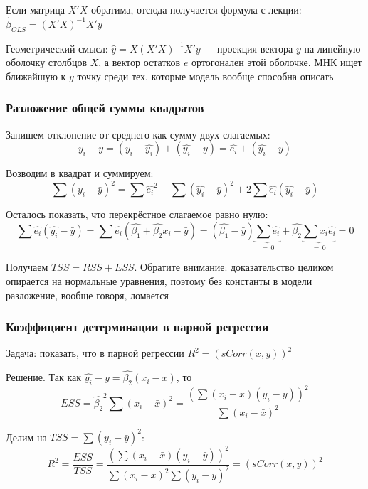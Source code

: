 \documentclass[12pt,a4paper]{article}
\numberwithin{equation}{section}
\theoremstyle{plain}
\theoremstyle{definition}
\theoremstyle{remark}
\begin{document}
Если матрица $X'X$ обратима, отсюда получается формула с лекции: $\hat{\beta}_{OLS} = \left(X'X\right)^{-1}X'y$

Геометрический смысл: $\hat{y} = X\left(X'X\right)^{-1}X'y$ — проекция вектора $y$ на линейную оболочку столбцов $X$, а вектор остатков $e$ ортогонален этой оболочке. МНК ищет ближайшую к $y$ точку среди тех, которые модель вообще способна описать

\subsubsection{Разложение общей суммы квадратов}

Запишем отклонение от среднего как сумму двух слагаемых:
$$
    y_i - \bar{y} = \left(y_i - \hat{y_i}\right) + \left(\hat{y_i} - \bar{y}\right) = \hat{e_i} + \left(\hat{y_i} - \bar{y}\right)
$$

Возводим в квадрат и суммируем:
$$
    \sum \left(y_i - \bar{y}\right)^2 = \sum \hat{e_i}^2 + \sum \left(\hat{y_i} - \bar{y}\right)^2 + 2\sum \hat{e_i}\left(\hat{y_i} - \bar{y}\right)
$$

Осталось показать, что перекрёстное слагаемое равно нулю:
$$
    \sum \hat{e_i}\left(\hat{y_i} - \bar{y}\right) = \sum \hat{e_i}\left(\hat{\beta_1} + \hat{\beta_2}x_i - \bar{y}\right) = \left(\hat{\beta_1} - \bar{y}\right)\underbrace{\sum \hat{e_i}}_{= \, 0} + \hat{\beta_2}\underbrace{\sum x_i \hat{e_i}}_{= \, 0} = 0
$$

Получаем $TSS = RSS + ESS$. Обратите внимание: доказательство целиком опирается на нормальные уравнения, поэтому без константы в модели разложение, вообще говоря, ломается

\subsubsection{Коэффициент детерминации в парной регрессии}

Задача: показать, что в парной регрессии $R^2 = \left(sCorr(x, y)\right)^2$

Решение. Так как $\hat{y_i} - \bar{y} = \hat{\beta_2}\left(x_i - \bar{x}\right)$, то
$$
    ESS = \hat{\beta_2}^2 \sum \left(x_i - \bar{x}\right)^2 = \frac{\left(\sum \left(x_i - \bar{x}\right)\left(y_i - \bar{y}\right)\right)^2}{\sum \left(x_i - \bar{x}\right)^2}
$$

Делим на $TSS = \sum \left(y_i - \bar{y}\right)^2$:
$$
    R^2 = \frac{ESS}{TSS} = \frac{\left(\sum \left(x_i - \bar{x}\right)\left(y_i - \bar{y}\right)\right)^2}{\sum \left(x_i - \bar{x}\right)^2 \sum \left(y_i - \bar{y}\right)^2} = \left(sCorr(x, y)\right)^2
$$
\end{document}
